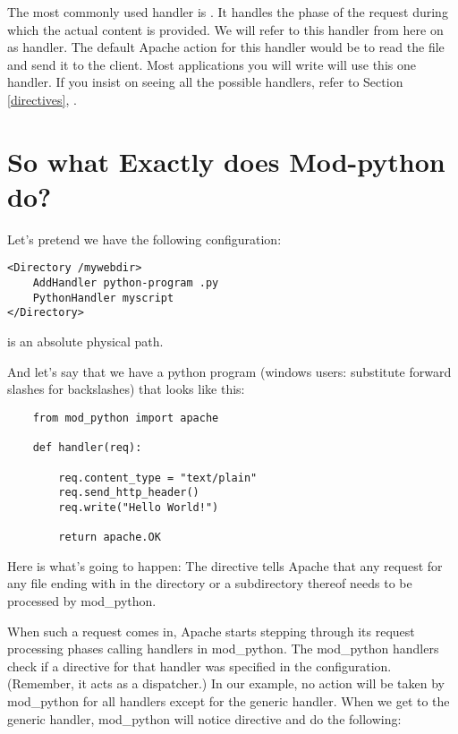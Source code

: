 The most commonly used handler is . It handles the
phase of the request during which the actual content is provided. We
will refer to this handler from here on as  handler. The
default Apache action for this handler would be to read the file and
send it to the client. Most applications you will write will use this
one handler. If you insist on seeing all the possible handlers, refer
to Section \ref{directives}, .

\section{So what Exactly does Mod-python do?\label{tut-what-it-do}}

Let's pretend we have the following configuration: 
\begin{verbatim}
<Directory /mywebdir>
    AddHandler python-program .py
    PythonHandler myscript
</Directory>
\end{verbatim}

  is an absolute physical path. 

And let's say that we have a python program (windows users: substitute
forward slashes for backslashes)  that looks like
this:

\begin{verbatim}
    from mod_python import apache

    def handler(req):

        req.content_type = "text/plain"
        req.send_http_header()
        req.write("Hello World!")

        return apache.OK
\end{verbatim}    

Here is what's going to happen: The  directive tells
Apache that any request for any file ending with  in the
 directory or a subdirectory thereof needs to be
processed by mod_python.

When such a request comes in, Apache starts stepping through its
request processing phases calling handlers in mod_python. The
mod_python handlers check if a directive for that handler was
specified in the configuration. (Remember, it acts as a dispatcher.)
In our example, no action will be taken by mod_python for
all handlers except for the generic handler. When we get to the
generic handler, mod_python will notice  directive and do the following:


